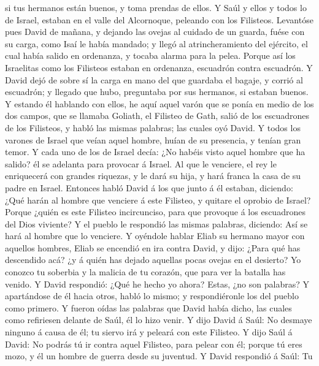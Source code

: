 si tus hermanos están buenos, y toma prendas de ellos.  Y
Saúl y ellos y todos lo de Israel, estaban en el valle del Alcornoque,
peleando con los Filisteos.  Levantóse pues David de
mañana, y dejando las ovejas al cuidado de un guarda, fuése con su
carga, como Isaí le había mandado; y llegó al atrincheramiento del
ejército, el cual había salido en ordenanza, y tocaba alarma para la
pelea.  Porque así los Israelitas como los Filisteos
estaban en ordenanza, escuadrón contra escuadrón.  Y David
dejó de sobre sí la carga en mano del que guardaba el bagaje, y corrió
al escuadrón; y llegado que hubo, preguntaba por sus hermanos, si
estaban buenos.  Y estando él hablando con ellos, he aquí
aquel varón que se ponía en medio de los dos campos, que se llamaba
Goliath, el Filisteo de Gath, salió de los escuadrones de los Filisteos,
y habló las mismas palabras; las cuales oyó David.  Y todos
los varones de Israel que veían aquel hombre, huían de su presencia, y
tenían gran temor.  Y cada uno de los de Israel decía: ¿No
habéis visto aquel hombre que ha salido? él se adelanta para provocar á
Israel. Al que le venciere, el rey le enriquecerá con grandes riquezas,
y le dará su hija, y hará franca la casa de su padre en Israel.
 Entonces habló David á los que junto á él estaban,
diciendo: ¿Qué harán al hombre que venciere á este Filisteo, y quitare
el oprobio de Israel? Porque ¿quién es este Filisteo incircunciso, para
que provoque á los escuadrones del Dios viviente?  Y el
pueblo le respondió las mismas palabras, diciendo: Así se hará al hombre
que lo venciere.  Y oyéndole hablar Eliab su hermano mayor
con aquellos hombres, Eliab se encendió en ira contra David, y dijo:
¿Para qué has descendido acá? ¿y á quién has dejado aquellas pocas
ovejas en el desierto? Yo conozco tu soberbia y la malicia de tu
corazón, que para ver la batalla has venido.  Y David
respondió: ¿Qué he hecho yo ahora? Estas, ¿no son palabras?
 Y apartándose de él hacia otros, habló lo mismo; y
respondiéronle los del pueblo como primero.  Y fueron oídas
las palabras que David había dicho, las cuales como refiriesen delante
de Saúl, él lo hizo venir.  Y dijo David á Saúl: No desmaye
ninguno á causa de él; tu siervo irá y peleará con este Filisteo.
 Y dijo Saúl á David: No podrás tú ir contra aquel
Filisteo, para pelear con él; porque tú eres mozo, y él un hombre de
guerra desde su juventud.  Y David respondió á Saúl: Tu
